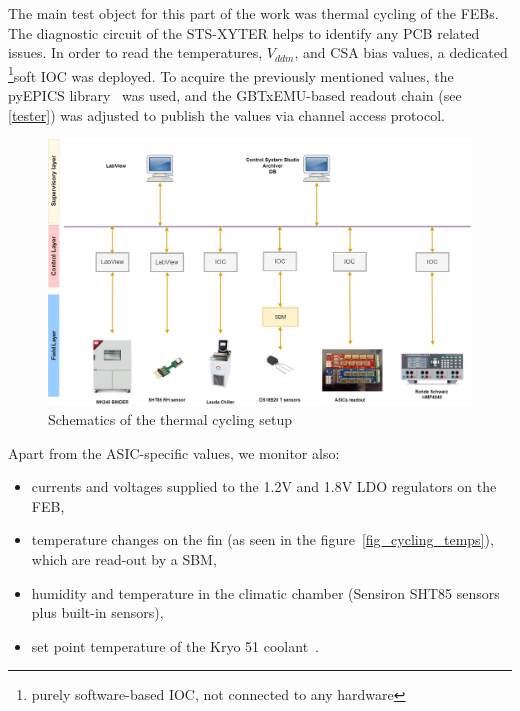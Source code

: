 The main test object for this part of the work was thermal cycling of the \gls{FEB}s. The diagnostic circuit of the \gls{STS}-XYTER helps to identify any \gls{PCB} related issues. In order to read the temperatures, $V_{ddm}$, and  \gls{CSA} bias values, a dedicated \footnote{purely software-based \gls{IOC}, not connected to any hardware}{soft IOC} was deployed. To acquire the previously mentioned values, the pyEPICS library~\cite{pyEPICS} was used, and the GBTxEMU-based readout chain (see \autoref{tester}) was adjusted to publish the values via channel access protocol. 
\begin{figure}[!h]
\centering
\includegraphics[width=0.95\columnwidth]{Chapter4/images/cycling_scheme.png}
\caption{Schematics of the thermal cycling setup}
\label{fig_setup}
\end{figure}
\newpage
Apart from the \gls{ASIC}-specific values, we monitor also:
\begin{itemize}
    \item currents and voltages supplied to the 1.2V and 1.8V \gls{LDO} regulators on the \gls{FEB}, 
    \item temperature changes on the fin (as seen in the figure~\ref{fig_cycling_temps}), which are read-out by a \gls{SBM},
    \item humidity and temperature in the climatic chamber (Sensiron SHT85 sensors plus built-in sensors),
    \item set point temperature of the Kryo 51 coolant~\cite{KRYO}.
\end{itemize}


